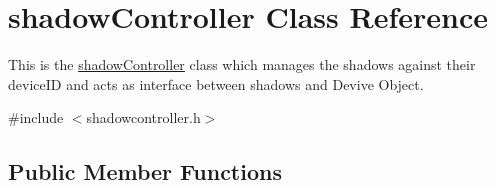 \hypertarget{classshadowController}{}\section{shadow\+Controller Class Reference}
\label{classshadowController}


This is the \hyperlink{classshadowController}{shadow\+Controller} class which manages the shadows against their device\+ID and acts as interface between shadows and Devive Object.  




{\ttfamily \#include $<$shadowcontroller.\+h$>$}

\subsection*{Public Member Functions}
